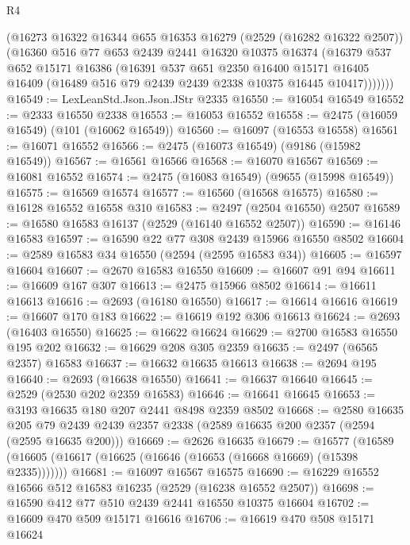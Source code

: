\begin{lexlean}{R4}
\begin{coremodule}
        (@16273
          @16322
          @16344
          @655
          @16353
          @16279
          (@2529 (@16282 @16322 @2507))
          (@16360
            @516
            @77
            @653
            @2439
            @2441
            @16320
            @10375
            @16374
            (@16379
              @537
              @652
              @15171
              @16386
              (@16391
                @537
                @651
                @2350
                @16400
                @15171
                @16405
                @16409
                (@16489 @516 @79 @2439 @2439 @2338 @10375 @16445 @10417)))))))
@16549 := LexLeanStd.Json.Json.JStr @2335
@16550 := @16054 @16549
@16552 := @2333 @16550 @2338
@16553 := @16053 @16552
@16558 := @2475 (@16059 @16549) (@101 (@16062 @16549))
@16560 := @16097 (@16553 @16558)
@16561 := @16071 @16552
@16566 := @2475 (@16073 @16549) (@9186 (@15982 @16549))
@16567 := @16561 @16566
@16568 := @16070 @16567
@16569 := @16081 @16552
@16574 := @2475 (@16083 @16549) (@9655 (@15998 @16549))
@16575 := @16569 @16574
@16577 := @16560 (@16568 @16575)
@16580 := @16128 @16552 @16558 @310
@16583 := @2497 (@2504 @16550) @2507
@16589 := @16580 @16583 @16137 (@2529 (@16140 @16552 @2507))
@16590 := @16146 @16583
@16597 := @16590 @22 @77 @308 @2439 @15966 @16550 @8502
@16604 := @2589 @16583 @34 @16550 (@2594 (@2595 @16583 @34))
@16605 := @16597 @16604
@16607 := @2670 @16583 @16550
@16609 := @16607 @91 @94
@16611 := @16609 @167 @307
@16613 := @2475 @15966 @8502
@16614 := @16611 @16613
@16616 := @2693 (@16180 @16550)
@16617 := @16614 @16616
@16619 := @16607 @170 @183
@16622 := @16619 @192 @306 @16613
@16624 := @2693 (@16403 @16550)
@16625 := @16622 @16624
@16629 := @2700 @16583 @16550 @195 @202
@16632 := @16629 @208 @305 @2359
@16635 := @2497 (@6565 @2357) @16583
@16637 := @16632 @16635 @16613
@16638 := @2694 @195
@16640 := @2693 (@16638 @16550)
@16641 := @16637 @16640
@16645 := @2529 (@2530 @202 @2359 @16583)
@16646 := @16641 @16645
@16653 := @3193 @16635 @180 @207 @2441 @8498 @2359 @8502
@16668 := @2580
    @16635
    @205
    @79
    @2439
    @2439
    @2357
    @2338
    (@2589 @16635 @200 @2357 (@2594 (@2595 @16635 @200)))
@16669 := @2626 @16635
@16679 := @16577
    (@16589 (@16605 (@16617 (@16625 (@16646 (@16653 (@16668 @16669) (@15398 @2335)))))))
@16681 := @16097 @16567 @16575
@16690 := @16229 @16552 @16566 @512 @16583 @16235 (@2529 (@16238 @16552 @2507))
@16698 := @16590 @412 @77 @510 @2439 @2441 @16550 @10375 @16604
@16702 := @16609 @470 @509 @15171 @16616
@16706 := @16619 @470 @508 @15171 @16624

\end{coremodule}
\end{lexlean}
